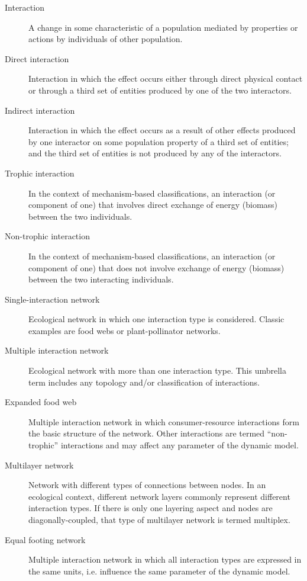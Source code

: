\begin{mdframed}
\begin{small}
\begin{description}
\item[Interaction] A change in some characteristic of a population mediated by properties or actions by individuals of other population.

\item[Direct interaction] Interaction in which the effect occurs either through direct physical contact or through a third set of entities produced by one of the two interactors.

\item[Indirect interaction] Interaction in which the effect occurs as a result of other effects produced by one interactor on some population property of a third set of entities; and the third set of entities is not produced by any of the interactors.

\item[Trophic interaction] In the context of mechanism-based classifications, an interaction (or component of one) that involves direct exchange of energy (biomass) between the two individuals.

\item[Non-trophic interaction] In the context of mechanism-based classifications, an interaction (or component of one) that does not involve exchange of energy (biomass) between the two interacting individuals.

\item[Single-interaction network] Ecological network in which one interaction type is considered. Classic examples are food webs or plant-pollinator networks.

\item[Multiple interaction network] Ecological network with more than one interaction type. This umbrella term includes any topology and/or classification of interactions.

\item[Expanded food web] Multiple interaction network in which consumer-resource interactions form the basic structure of the network. Other interactions are termed ``non-trophic'' interactions and may affect any parameter of the dynamic model.

\item[Multilayer network] Network with different types of connections between nodes. In an ecological context, different network layers commonly represent different interaction types. If there is only one layering aspect and nodes are diagonally-coupled, that type of multilayer network is termed multiplex.

\item[Equal footing network] Multiple interaction network in which all interaction types are expressed in the same units, i.e. influence the same parameter of the dynamic model.

\end{description}
\end{small}
\end{mdframed}

